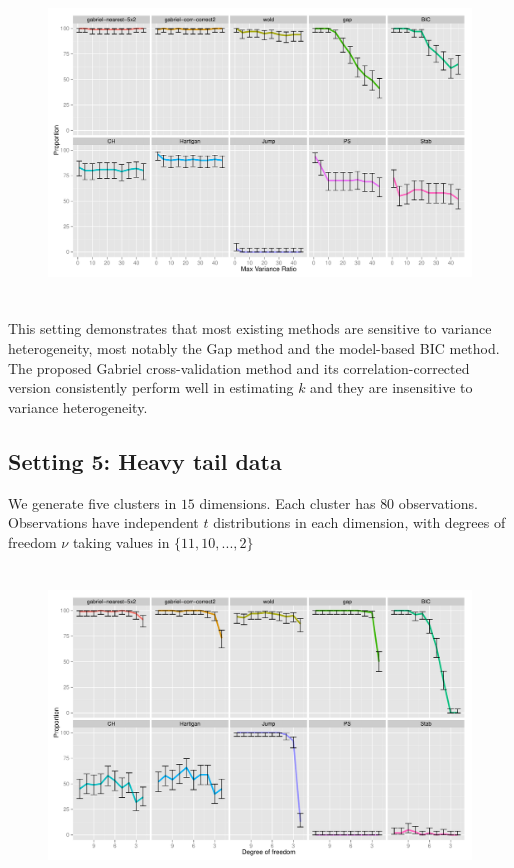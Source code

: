 \documentclass[12pt]{article}
\begin{document}
\begin{figure}[H]
\centering
\includegraphics[width=5.5in, height=3.3in]{New simulation/demo/bench/setting4/Facet.pdf}
\label{fig:setting4}
\end{figure}

This setting demonstrates that most existing methods are sensitive to variance
heterogeneity, most notably the Gap method and the model-based BIC method. The
proposed Gabriel cross-validation method and its correlation-corrected version
consistently perform well in estimating $k$ and they are insensitive to
variance heterogeneity.
	

\subsection{Setting 5: Heavy tail data}

We generate five clusters in $15$ dimensions. Each cluster has $80$
observations.  Observations have independent $t$ distributions in each
dimension, with degrees of freedom $\nu$ taking values in $\{11,10,...,2\}$
     
\begin{figure}[H]
\centering
\includegraphics[width=5.5in, height=3.3in]{New simulation/demo/bench/setting5/Facet.pdf}
\label{fig:setting5}
\end{figure}
\end{document}

